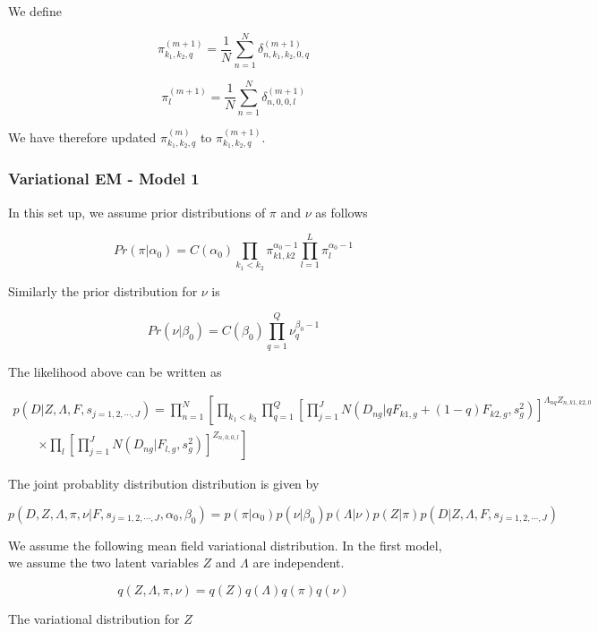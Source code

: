 \documentclass[12pt]{article}
\begin{document}
We define 

$$ \pi^{(m+1)}_{k_1, k_2, q} = \frac{1}{N}\sum_{n=1}^{N} \delta^{(m+1)}_{n, k_1, k_2, 0, q} $$

$$ \pi^{(m+1)}_{l} = \frac{1}{N}\sum_{n=1}^{N} \delta^{(m+1)}_{n, 0, 0, l} $$

We have therefore updated $\pi^{(m)}_{k_1, k_2, q}$ to $\pi^{(m+1)}_{k_1, k_2, q}$.


\subsubsection{Variational EM  - Model 1}

In this set up, we assume prior distributions of $\pi$ and $\nu$ as follows

$$ Pr (\pi | \alpha_{0}) = C (\alpha_0) \prod_{k_1 < k_2} \pi_{k1, k2}^{\alpha_0 -1} \prod_{l=1}^{L} \pi_{l}^{\alpha_0 -1}$$

Similarly the prior distribution for $\nu$ is 

$$ Pr (\nu | \beta_0) = C (\beta_0) \prod_{q=1}^{Q} \nu_{q}^{\beta_0 -1 }  $$

The likelihood above can be written as 

\begin{multline}
p (D | Z, \Lambda, F, s_{j=1,2,\cdots,J}) = \prod_{n=1}^{N} \left [ \prod_{k_1 < k_2} \prod_{q=1}^{Q} \left [ \prod_{j=1}^{J} N (D_{ng} | qF_{k1,g} + (1-q)F_{k2,g}, s^2_{g}) \right ]^{\Lambda_{nq}Z_{n, k1, k2, 0}}   \right. \\
\qquad \left. \times \prod_{l} \left [ \prod_{j=1}^{J} N (D_{ng} | F_{l,g}, s^2_{g}) \right ]^{Z_{n, 0, 0, l}} \right] 
\end{multline}

The joint probablity distribution distribution is given by 

$$ p (D, Z, \Lambda, \pi, \nu | F, s_{j=1,2,\cdots,J}, \alpha_{0}, \beta_{0}) = p (\pi | \alpha_0) p (\nu | \beta_0)  p (\Lambda | \nu) p (Z | \pi) p (D | Z, \Lambda, F, s_{j=1,2,\cdots,J})  $$


We assume the following mean field variational distribution. In the first model, we assume the two latent variables $Z$ and $\Lambda$ are independent. 

$$ q(Z, \Lambda, \pi, \nu) = q(Z) q(\Lambda) q(\pi) q(\nu) $$

The variational distribution for $Z$
\end{document}
